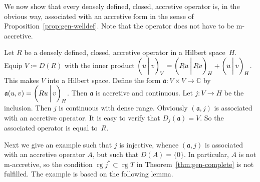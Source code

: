 \documentclass[a4paper,oneside,12pt]{amsart}
\theoremstyle{plain}
\theoremstyle{definition}
\newenvironment{example}
{\pushQED{\qed}

\examplex}
{\popQED\endexamplex}
\begin{document}
We now show that every densely defined, closed, accretive operator is, in the obvious way, associated with an accretive form in the sense of Proposition~\ref{prop:gen-welldef}.
Note that the operator does not have to be {\ensuremath{\text{m}}}-accretive.
\begin{example}\label{ex:dd-acc-op}
Let $R$ be a densely defined, closed, accretive operator in a Hilbert space~$H$. Equip $V\coloneqq D(R)$ with the inner product ${{\ifthenelse{\equal{auto}{auto}}{\left({u}\mkern3mu{\biggm|}\mkern3mu {v}\right)}{}
\ifthenelse{\equal{auto}{b}}{\bigl({u}\mkern3mu{\biggm|}\mkern3mu {v}\bigr)}{}
\ifthenelse{\equal{auto}{B}}{\Bigl({u}\mkern3mu{\bigm|}\mkern3mu {v}\Bigr)}{}
}}_V={{\ifthenelse{\equal{auto}{auto}}{\left({Ru}\mkern3mu{\biggm|}\mkern3mu {Rv}\right)}{}
\ifthenelse{\equal{auto}{b}}{\bigl({Ru}\mkern3mu{\biggm|}\mkern3mu {Rv}\bigr)}{}
\ifthenelse{\equal{auto}{B}}{\Bigl({Ru}\mkern3mu{\bigm|}\mkern3mu {Rv}\Bigr)}{}
}}_H+{{\ifthenelse{\equal{auto}{auto}}{\left({u}\mkern3mu{\biggm|}\mkern3mu {v}\right)}{}
\ifthenelse{\equal{auto}{b}}{\bigl({u}\mkern3mu{\biggm|}\mkern3mu {v}\bigr)}{}
\ifthenelse{\equal{auto}{B}}{\Bigl({u}\mkern3mu{\bigm|}\mkern3mu {v}\Bigr)}{}
}}_H$.
This makes $V$ into a Hilbert space.
Define the form ${{\mathfrak{{a}}}}\colon V\times V\to{\mathbb{C}}$ by ${{\mathfrak{{a}}}}(u,v)={{\ifthenelse{\equal{auto}{auto}}{\left({Ru}\mkern3mu{\biggm|}\mkern3mu {v}\right)}{}
\ifthenelse{\equal{auto}{b}}{\bigl({Ru}\mkern3mu{\biggm|}\mkern3mu {v}\bigr)}{}
\ifthenelse{\equal{auto}{B}}{\Bigl({Ru}\mkern3mu{\bigm|}\mkern3mu {v}\Bigr)}{}
}}_H$.
Then ${{\mathfrak{{a}}}}$ is accretive and continuous. Let $j\colon V\to H$ be the inclusion.
Then $j$ is continuous with dense range. 
Obviously $({{\mathfrak{{a}}}},j)$ is associated with an accretive operator.
It is easy to verify that $D_j({{\mathfrak{{a}}}})=V$. So the associated operator is equal to~$R$.
\end{example}

Next we give an example such that $j$ is injective, whence $({{\mathfrak{{a}}}},j)$ is associated with an accretive operator $A$,
but such that $D(A)=\{0\}$.
In particular, $A$ is not {\ensuremath{\text{m}}}-accretive, so the condition $\operatorname{rg} j^*\subset\operatorname{rg} T$ in Theorem~\ref{thm:gen-complete} is not fulfilled.
The example is based on the following lemma.
\end{document}
